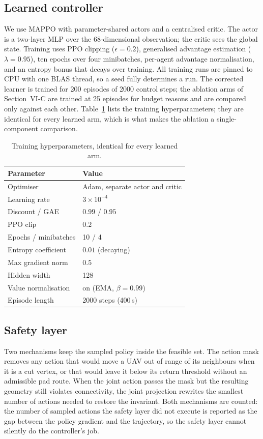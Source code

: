 \documentclass[conference]{IEEEtran}
\begin{document}
\subsection{Learned controller}
We use MAPPO with parameter-shared actors and a centralised critic. The actor is a two-layer MLP over the 68-dimensional observation; the critic sees the global state. Training uses PPO clipping ($\epsilon=0.2$), generalised advantage estimation ($\lambda=0.95$), ten epochs over four minibatches, per-agent advantage normalisation, and an entropy bonus that decays over training. All training runs are pinned to CPU with one BLAS thread, so a seed fully determines a run. The corrected learner is trained for 200 episodes of 2000 control steps; the ablation arms of Section~VI-C are trained at 25 episodes for budget reasons and are compared only against each other. Table~\ref{tab:hparams} lists the training hyperparameters; they are identical for every learned arm, which is what makes the ablation a single-component comparison.

\begin{table}[t]
\caption{Training hyperparameters, identical for every learned arm.}
\label{tab:hparams}
\centering
\small
\setlength{\tabcolsep}{4pt}
\begin{tabular}{@{}ll@{}}
\toprule
Parameter & Value \\
\midrule
Optimiser & Adam, separate actor and critic \\
Learning rate & $3\times10^{-4}$ \\
Discount / GAE & $0.99$ / $0.95$ \\
PPO clip & $0.2$ \\
Epochs / minibatches & 10 / 4 \\
Entropy coefficient & $0.01$ (decaying) \\
Max gradient norm & $0.5$ \\
Hidden width & 128 \\
Value normalisation & on (EMA, $\beta=0.99$) \\
Episode length & 2000 steps (400\,s) \\
\bottomrule
\end{tabular}
\end{table}

\subsection{Safety layer}
Two mechanisms keep the sampled policy inside the feasible set. The action mask removes any action that would move a UAV out of range of its neighbours when it is a cut vertex, or that would leave it below its return threshold without an admissible pad route. When the joint action passes the mask but the resulting geometry still violates connectivity, the joint projection rewrites the smallest number of actions needed to restore the invariant. Both mechanisms are counted: the number of sampled actions the safety layer did not execute is reported as the gap between the policy gradient and the trajectory, so the safety layer cannot silently do the controller's job.
\end{document}

